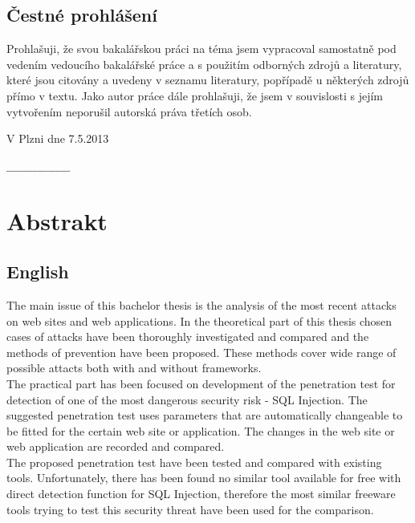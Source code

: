 \documentclass[12pt, a4paper]{report}
\begin{document}
\subsection*{Čestné prohlášení}
Prohlašuji, že svou bakalářskou práci na téma  jsem vypracoval samostatně pod vedením vedoucího bakalářské práce a s použitím odborných zdrojů a literatury, které jsou citovány a uvedeny v seznamu literatury, popřípadě u některých zdrojů přímo v textu. Jako autor práce dále prohlašuji, že jsem v souvislosti s jejím vytvořením neporušil autorská práva třetích osob.
\\[1.5cm]
\begin{minipage}{0.4\textwidth}
\begin{flushleft}
V Plzni dne 7.5.2013
\end{flushleft}
\end{minipage}
\begin{minipage}{0.6\textwidth}
\begin{flushright} 
$\_\_\_\_\_\_\_\_\_\_\_\_\_\_\_\_\_$
\end{flushright}
\end{minipage}
\newpage
\thispagestyle{empty}
\section*{Abstrakt}
\subsection*{English}
The main issue of this bachelor thesis is the analysis of the most recent attacks on web sites and web applications. In the theoretical part of this thesis chosen cases of attacks have been thoroughly investigated and compared and the methods of prevention have been proposed. These methods cover wide range of possible attacts both with and without frameworks. \\
The practical part has been focused on development of the penetration test for detection of one of the most dangerous security risk - SQL Injection. The suggested penetration test uses parameters that are automatically changeable to be fitted for the certain web site or application. The changes in the web site or web application are recorded and compared.\\
The proposed penetration test have been tested and compared with existing tools. Unfortunately, there has been found no similar tool available for free with direct detection function for SQL Injection, therefore the most similar freeware tools trying to test this security threat have been used for the comparison.
\end{document}
